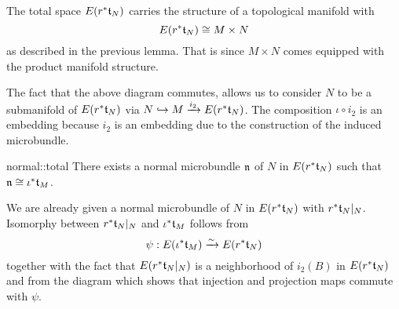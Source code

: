 \begin{myparagraph}
    The total space $E(r^*\mathfrak{t}_N)$ carries the structure of a topological manifold with
    \[ E(r^*\mathfrak{t}_N) \cong M \times N \]
    as described in the previous lemma.
    That is since $M \times N$ comes equipped with the product manifold structure.

    The fact that the above diagram commutes,
    allows us to consider $N$ to be a submanifold of $E(r^*\mathfrak{t}_N)$ via $N \hookrightarrow{} M \xrightarrow{i_2} E(r^*\mathfrak{t}_N)$.
    The composition $\iota \circ i_2$ is an embedding because $i_2$ is an embedding
    due to the construction of the induced microbundle.
\end{myparagraph}

\begin{mylemma}{normal::total}
    There exists a normal microbundle $\mathfrak{n}$ of $N$ in $E(r^*\mathfrak{t}_N)$ such that $\mathfrak{n} \cong \iota^*\mathfrak{t}_M$.
\end{mylemma}

\begin{myproof}
    We are already given a normal microbundle of $N$ in $E(r^*\mathfrak{t}_N)$ with $r^*\mathfrak{t}_N\vert_{N}$.
    Isomorphy between $r^*\mathfrak{t}_N\vert_{N}$ and $\iota^*\mathfrak{t}_M$ follows from
    \[ \psi: E(\iota^*\mathfrak{t}_M) \xrightarrow{\sim} E(r^*\mathfrak{t}_N) \]
    together with the fact that $E(r^*\mathfrak{t}_N\vert_{N})$ is a neighborhood of $i_2(B)$ in $E(r^*\mathfrak{t}_N)$
    and from the diagram which shows that injection and projection maps commute with $\psi$.
\end{myproof}